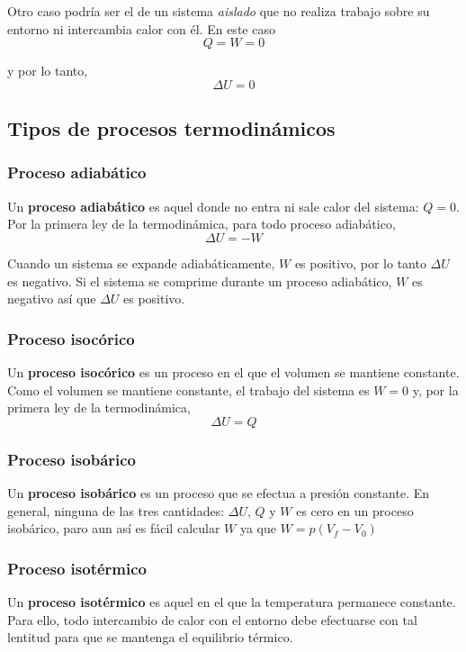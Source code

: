 \documentclass[12pt]{article}
\begin{document}
  Otro caso podría ser el de un sistema \textit{aislado} que no realiza trabajo sobre su entorno ni intercambia calor con él. En este caso 
  \[
  Q = W = 0
  \]

  y por lo tanto,
  \[
  \Delta U = 0
  \]

  \subsection{Tipos de procesos termodinámicos}
  \subsubsection{Proceso adiabático}
  Un \textbf{proceso adiabático} es aquel donde no entra ni sale calor del sistema: $ Q = 0 $. Por la primera ley de la termodinámica, para todo proceso adiabático, 
  \[
  \Delta U = -W
  \]

  Cuando un sistema se expande adiabáticamente, $ W $ es positivo, por lo tanto $ \Delta U $ es negativo. Si el sistema se comprime durante un proceso adiabático, $ W $ es negativo así que $ \Delta U $ es positivo.

  \subsubsection{Proceso isocórico}
  Un \textbf{proceso isocórico} es un proceso en el que el volumen se mantiene constante. Como el volumen se mantiene constante, el trabajo del sistema es $ W = 0 $ y, por la primera ley de la termodinámica, 
  \[
  \Delta U = Q
  \]

  \subsubsection{Proceso isobárico}
  Un \textbf{proceso isobárico} es un proceso que se efectua a presión constante. En general, ninguna de las tres cantidades: $ \Delta U $, $ Q $ y $ W $ es cero en un proceso isobárico, paro aun así es fácil calcular $ W $ ya que 
  $ W = p(V_{f}-V_{0}) $

  \subsubsection{Proceso isotérmico}
  Un \textbf{proceso isotérmico} es aquel en el que la temperatura permanece constante. Para ello, todo intercambio de calor con el entorno debe efectuarse con tal lentitud para que se mantenga el equilibrio térmico. 
\end{document}
